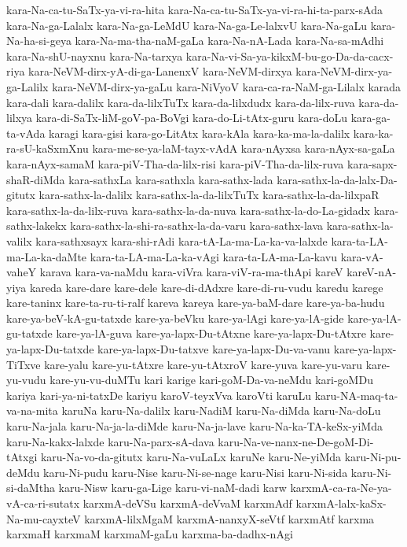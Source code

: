 {kara-Na-ca-tu-SaTx-ya-vi-ra-hita
kara-Na-ca-tu-SaTx-ya-vi-ra-hi-ta-parx-sAda
kara-Na-ga-Lalalx
kara-Na-ga-LeMdU
kara-Na-ga-Le-lalxvU
kara-Na-gaLu
kara-Na-ha-si-geya
kara-Na-ma-tha-naM-gaLa
kara-Na-nA-Lada
kara-Na-sa-mAdhi
kara-Na-shU-nayxnu
kara-Na-tarxya
kara-Na-vi-Sa-ya-kikxM-bu-go-Da-da-cacx-riya
kara-NeVM-dirx-yA-di-ga-LanenxV
kara-NeVM-dirxya
kara-NeVM-dirx-ya-ga-Lalilx
kara-NeVM-dirx-ya-gaLu
kara-NiVyoV
kara-ca-ra-NaM-ga-Lilalx
karada
kara-dali
kara-dalilx
kara-da-lilxTuTx
kara-da-lilxdudx
kara-da-lilx-ruva
kara-da-lilxya
kara-di-SaTx-liM-goV-pa-BoVgi
kara-do-Li-tAtx-guru
kara-doLu
kara-ga-ta-vAda
karagi
kara-gisi
kara-go-LitAtx
kara-kAla
kara-ka-ma-la-dalilx
kara-ka-ra-sU-kaSxmXnu
kara-me-se-ya-laM-tayx-vAdA
kara-nAyxsa
kara-nAyx-sa-gaLa
kara-nAyx-samaM
kara-piV-Tha-da-lilx-risi
kara-piV-Tha-da-lilx-ruva
kara-sapx-shaR-diMda
kara-sathxLa
kara-sathxla
kara-sathx-lada
kara-sathx-la-da-lalx-Da-gitutx
kara-sathx-la-dalilx
kara-sathx-la-da-lilxTuTx
kara-sathx-la-da-lilxpaR
kara-sathx-la-da-lilx-ruva
kara-sathx-la-da-nuva
kara-sathx-la-do-La-gidadx
kara-sathx-lakekx
kara-sathx-la-shi-ra-sathx-la-da-varu
kara-sathx-lava
kara-sathx-la-valilx
kara-sathxsayx
kara-shi-rAdi
kara-tA-La-ma-La-ka-va-lalxde
kara-ta-LA-ma-La-ka-daMte
kara-ta-LA-ma-La-ka-vAgi
kara-ta-LA-ma-La-kavu
kara-vA-vaheY
karava
kara-va-naMdu
kara-viVra
kara-viV-ra-ma-thApi
kareV
kareV-nA-yiya
kareda
kare-dare
kare-dele
kare-di-dAdxre
kare-di-ru-vudu
karedu
karege
kare-taninx
kare-ta-ru-ti-ralf
kareva
kareya
kare-ya-baM-dare
kare-ya-ba-hudu
kare-ya-beV-kA-gu-tatxde
kare-ya-beVku
kare-ya-lAgi
kare-ya-lA-gide
kare-ya-lA-gu-tatxde
kare-ya-lA-guva
kare-ya-lapx-Du-tAtxne
kare-ya-lapx-Du-tAtxre
kare-ya-lapx-Du-tatxde
kare-ya-lapx-Du-tatxve
kare-ya-lapx-Du-va-vanu
kare-ya-lapx-TiTxve
kare-yalu
kare-yu-tAtxre
kare-yu-tAtxroV
kare-yuva
kare-yu-varu
kare-yu-vudu
kare-yu-vu-duMTu
kari
karige
kari-goM-Da-va-neMdu
kari-goMDu
kariya
kari-ya-ni-tatxDe
kariyu
karoV-teyxVva
karoVti
karuLu
karu-NA-maq-ta-va-na-mita
karuNa
karu-Na-dalilx
karu-NadiM
karu-Na-diMda
karu-Na-doLu
karu-Na-jala
karu-Na-ja-la-diMde
karu-Na-ja-lave
karu-Na-ka-TA-keSx-yiMda
karu-Na-kakx-lalxde
karu-Na-parx-sA-dava
karu-Na-ve-nanx-ne-De-goM-Di-tAtxgi
karu-Na-vo-da-gitutx
karu-Na-vuLaLx
karuNe
karu-Ne-yiMda
karu-Ni-pu-deMdu
karu-Ni-pudu
karu-Nise
karu-Ni-se-nage
karu-Nisi
karu-Ni-sida
karu-Ni-si-daMtha
karu-Nisw
karu-ga-Lige
karu-vi-naM-dadi
karw
karxmA-ca-ra-Ne-ya-vA-ca-ri-sutatx
karxmA-deVSu
karxmA-deVvaM
karxmAdf
karxmA-lalx-kaSx-Na-mu-cayxteV
karxmA-lilxMgaM
karxmA-nanxyX-seVtf
karxmAtf
karxma
karxmaH
karxmaM
karxmaM-gaLu
karxma-ba-dadhx-nAgi
}
